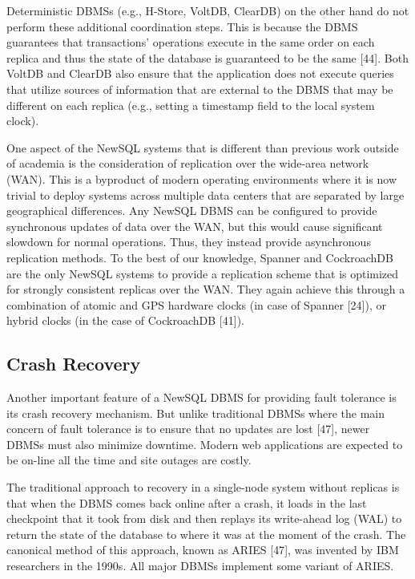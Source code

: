 \documentclass[a4paper,11pt,twoside,openright]{article}
\begin{document}
Deterministic DBMSs (e.g., H-Store, VoltDB, ClearDB) on the other hand
do not perform these additional coordination steps. This is because the
DBMS guarantees that transactions' operations execute in the same order
on each replica and thus the state of the database is guaranteed to be
the same {[}44{]}. Both VoltDB and ClearDB also ensure that the
application does not execute queries that utilize sources of information
that are external to the DBMS that may be different on each replica
(e.g., setting a timestamp field to the local system clock).

One aspect of the NewSQL systems that is different than previous work
outside of academia is the consideration of replication over the
wide-area network (WAN). This is a byproduct of modern operating
environments where it is now trivial to deploy systems across multiple
data centers that are separated by large geographical differences. Any
NewSQL DBMS can be configured to provide synchronous updates of data
over the WAN, but this would cause significant slowdown for normal
operations. Thus, they instead provide asynchronous replication methods.
To the best of our knowledge, Spanner and CockroachDB are the only
NewSQL systems to provide a replication scheme that is optimized for
strongly consistent replicas over the WAN. They again achieve this
through a combination of atomic and GPS hardware clocks (in case of
Spanner {[}24{]}), or hybrid clocks (in the case of CockroachDB
{[}41{]}).

\hypertarget{crash-recovery}{%
\subsection{Crash Recovery}\label{crash-recovery}}

Another important feature of a NewSQL DBMS for providing fault tolerance
is its crash recovery mechanism. But unlike traditional DBMSs where the
main concern of fault tolerance is to ensure that no updates are lost
{[}47{]}, newer DBMSs must also minimize downtime. Modern web
applications are expected to be on-line all the time and site outages
are costly.

The traditional approach to recovery in a single-node system without
replicas is that when the DBMS comes back online after a crash, it loads
in the last checkpoint that it took from disk and then replays its
write-ahead log (WAL) to return the state of the database to where it
was at the moment of the crash. The canonical method of this approach,
known as ARIES {[}47{]}, was invented by IBM researchers in the 1990s.
All major DBMSs implement some variant of ARIES.
\end{document}
